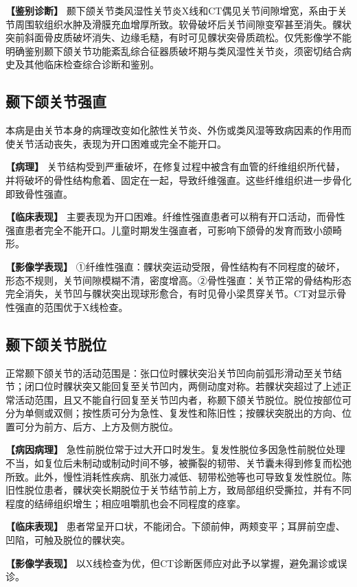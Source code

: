 \textbf{【鉴别诊断】}
颞下颌关节类风湿性关节炎X线和CT偶见关节间隙增宽，系由于关节周围软组织水肿及滑膜充血增厚所致。软骨破坏后关节间隙变窄甚至消失。髁状突前斜面骨皮质破坏消失、边缘毛糙，有时可见髁状突骨质疏松。仅凭影像学不能明确鉴别颞下颌关节功能紊乱综合征器质破坏期与类风湿性关节炎，须密切结合病史及其他临床检查综合诊断和鉴别。

\subsection{颞下颌关节强直}

本病是由关节本身的病理改变如化脓性关节炎、外伤或类风湿等致病因素的作用而使关节活动丧失，表现为开口困难或完全不能开口。

\textbf{【病理】}
关节结构受到严重破坏，在修复过程中被含有血管的纤维组织所代替，并将破坏的骨性结构愈着、固定在一起，导致纤维强直。这些纤维组织进一步骨化即致骨性强直。

\textbf{【临床表现】}
主要表现为开口困难。纤维性强直患者可以稍有开口活动，而骨性强直患者完全不能开口。儿童时期发生强直者，可影响下颌骨的发育而致小颌畸形。

\textbf{【影像学表现】}
①纤维性强直：髁状突运动受限，骨性结构有不同程度的破坏，形态不规则，关节间隙模糊不清，密度增高。②骨性强直：关节正常的骨结构形态完全消失，关节凹与髁状突出现球形愈合，有时见骨小梁贯穿关节。CT对显示骨性强直的范围优于X线检查。

\subsection{颞下颌关节脱位}

正常颞下颌关节的活动范围是：张口位时髁状突沿关节凹向前弧形滑动至关节结节；闭口位时髁状突又能回复至关节凹内，两侧动度对称。若髁状突超过了上述正常活动范围，且又不能自行回复至关节凹内者，称颞下颌关节脱位。脱位按部位可分为单侧或双侧；按性质可分为急性、复发性和陈旧性；按髁状突脱出的方向、位置可分为前方、后方、上方及侧方脱位。

\textbf{【病因病理】}
急性前脱位常于过大开口时发生。复发性脱位多因急性前脱位处理不当，如复位后未制动或制动时间不够，被撕裂的韧带、关节囊未得到修复而松弛所致。此外，慢性消耗性疾病、肌张力减低、韧带松弛等也可导致复发性脱位。陈旧性脱位患者，髁状突长期脱位于关节结节前上方，致局部组织受撕拉，并有不同程度的结缔组织增生；相应咀嚼肌也会不同程度的痉挛。

\textbf{【临床表现】}
患者常呈开口状，不能闭合。下颌前伸，两颊变平；耳屏前空虚、凹陷，可触及脱位的髁状突。

\textbf{【影像学表现】}
以X线检查为优，但CT诊断医师应对此予以掌握，避免漏诊或误诊。

